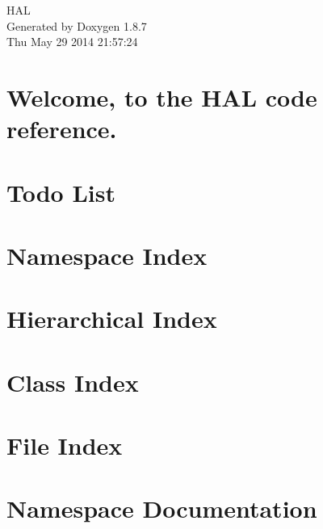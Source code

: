 \documentclass[twoside]{book}
\newcommand{\+}{\discretionary{\mbox{\scriptsize$\hookleftarrow$}}{}{}}
\newcommand{\clearemptydoublepage}{%
  \newpage{\pagestyle{empty}\cleardoublepage}%
}
\begin{document}
\hypersetup{pageanchor=false,
             bookmarks=true,
             bookmarksnumbered=true,
             pdfencoding=unicode
            }
\begin{titlepage}
\vspace*{7cm}
\begin{center}%
{\Large H\+A\+L }\\
\vspace*{1cm}
{\large Generated by Doxygen 1.8.7}\\
\vspace*{0.5cm}
{\small Thu May 29 2014 21:57:24}\\
\end{center}
\end{titlepage}
\clearemptydoublepage
\tableofcontents
\clearemptydoublepage
{}
\hypersetup{pageanchor=true}

\chapter{Welcome, to the H\+A\+L code reference.}
\label{index}\hypertarget{index}{}
\chapter{Todo List}
\label{todo}
\hypertarget{todo}{}

\chapter{Namespace Index}

\chapter{Hierarchical Index}

\chapter{Class Index}

\chapter{File Index}

\chapter{Namespace Documentation}

\end{document}

